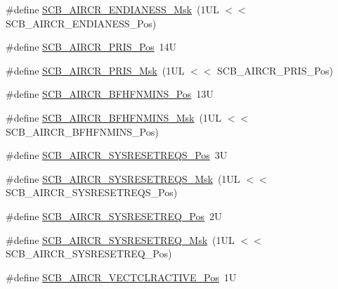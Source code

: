 \begin{DoxyCompactItemize}
\item 
\#define \mbox{\hyperlink{group___c_m_s_i_s___s_c_b_ga2f571f93d3d4a6eac9a3040756d3d951}{S\+C\+B\+\_\+\+A\+I\+R\+C\+R\+\_\+\+E\+N\+D\+I\+A\+N\+E\+S\+S\+\_\+\+Msk}}~(1\+U\+L $<$$<$ S\+C\+B\+\_\+\+A\+I\+R\+C\+R\+\_\+\+E\+N\+D\+I\+A\+N\+E\+S\+S\+\_\+\+Pos)
\item 
\#define \mbox{\hyperlink{group___c_m_s_i_s___s_c_b_ga2590e227eedb35a41044d8fb7feb9037}{S\+C\+B\+\_\+\+A\+I\+R\+C\+R\+\_\+\+P\+R\+I\+S\+\_\+\+Pos}}~14U
\item 
\#define \mbox{\hyperlink{group___c_m_s_i_s___s_c_b_ga0032bb51f38e103fc34c2a57e59ada6f}{S\+C\+B\+\_\+\+A\+I\+R\+C\+R\+\_\+\+P\+R\+I\+S\+\_\+\+Msk}}~(1\+U\+L $<$$<$ S\+C\+B\+\_\+\+A\+I\+R\+C\+R\+\_\+\+P\+R\+I\+S\+\_\+\+Pos)
\item 
\#define \mbox{\hyperlink{group___c_m_s_i_s___s_c_b_ga94e2fc10be4f6065dcb5a7276b40d933}{S\+C\+B\+\_\+\+A\+I\+R\+C\+R\+\_\+\+B\+F\+H\+F\+N\+M\+I\+N\+S\+\_\+\+Pos}}~13U
\item 
\#define \mbox{\hyperlink{group___c_m_s_i_s___s_c_b_gabc24019f3b54b8d2acd23016b2e0c7b9}{S\+C\+B\+\_\+\+A\+I\+R\+C\+R\+\_\+\+B\+F\+H\+F\+N\+M\+I\+N\+S\+\_\+\+Msk}}~(1\+U\+L $<$$<$ S\+C\+B\+\_\+\+A\+I\+R\+C\+R\+\_\+\+B\+F\+H\+F\+N\+M\+I\+N\+S\+\_\+\+Pos)
\item 
\#define \mbox{\hyperlink{group___c_m_s_i_s___s_c_b_ga7e6b3da07caee0726c5aab97ecebc2a5}{S\+C\+B\+\_\+\+A\+I\+R\+C\+R\+\_\+\+S\+Y\+S\+R\+E\+S\+E\+T\+R\+E\+Q\+S\+\_\+\+Pos}}~3U
\item 
\#define \mbox{\hyperlink{group___c_m_s_i_s___s_c_b_gaf4b7fe06aaa2e87cdaf25a720dd282a1}{S\+C\+B\+\_\+\+A\+I\+R\+C\+R\+\_\+\+S\+Y\+S\+R\+E\+S\+E\+T\+R\+E\+Q\+S\+\_\+\+Msk}}~(1\+U\+L $<$$<$ S\+C\+B\+\_\+\+A\+I\+R\+C\+R\+\_\+\+S\+Y\+S\+R\+E\+S\+E\+T\+R\+E\+Q\+S\+\_\+\+Pos)
\item 
\#define \mbox{\hyperlink{group___c_m_s_i_s___s_c_b_gaffb2737eca1eac0fc1c282a76a40953c}{S\+C\+B\+\_\+\+A\+I\+R\+C\+R\+\_\+\+S\+Y\+S\+R\+E\+S\+E\+T\+R\+E\+Q\+\_\+\+Pos}}~2U
\item 
\#define \mbox{\hyperlink{group___c_m_s_i_s___s_c_b_gaae1181119559a5bd36e62afa373fa720}{S\+C\+B\+\_\+\+A\+I\+R\+C\+R\+\_\+\+S\+Y\+S\+R\+E\+S\+E\+T\+R\+E\+Q\+\_\+\+Msk}}~(1\+U\+L $<$$<$ S\+C\+B\+\_\+\+A\+I\+R\+C\+R\+\_\+\+S\+Y\+S\+R\+E\+S\+E\+T\+R\+E\+Q\+\_\+\+Pos)
\item 
\#define \mbox{\hyperlink{group___c_m_s_i_s___s_c_b_gaa30a12e892bb696e61626d71359a9029}{S\+C\+B\+\_\+\+A\+I\+R\+C\+R\+\_\+\+V\+E\+C\+T\+C\+L\+R\+A\+C\+T\+I\+V\+E\+\_\+\+Pos}}~1U
\item 
$$
\end{DoxyCompactItemize}
